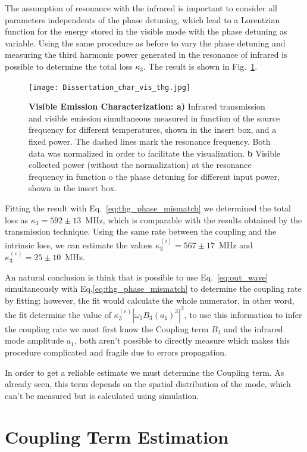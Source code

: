 The assumption of resonance with the infrared is important to consider all parameters independents of the phase detuning, which lead to a Lorentzian function for the energy stored in the visible mode with the phase detuning as variable. Using the same procedure as before to vary the phase detuning and measuring the third harmonic power generated in the resonance of infrared is possible to determine the total loss $\kappa_3$. The result is shown in Fig.~\ref{fig:mode_char_thg}.
\begin{figure}[!h]
    \centering
    \texttt{[image: Dissertation\_char\_vis\_thg.jpg]}
    \caption{\textbf{Visible Emission Characterization: a)} Infrared transmission and visible emission simultaneous measured in function of the source frequency for different temperatures, shown in the insert box, and a fixed power. The dashed lines mark the resonance frequency. Both data was normalized in order to facilitate the visualization. \textbf{b} Visible collected power (without the normalization) at the resonance frequency in function o the phase detuning for different input power,  shown in the insert box.}
    \label{fig:mode_char_thg}
\end{figure}

Fitting the result with Eq.~\ref{eq:thg_phase_mismatch} we determined the total loss as $\kappa_3 = 592\pm13$~MHz, which is comparable with the results obtained by the transmission technique. Using the same rate between the coupling and the intrinsic loss, we can estimate the values $\kappa_3^{(i)} = 567\pm17$~MHz and $\kappa_3^{(e)}=25\pm10$~MHz. 

An natural conclusion is think that is possible to use Eq.~\ref{eq:out_wave} simultaneously with Eq.\ref{eq:thg_phase_mismatch} to determine the coupling rate by fitting; however, the fit would calculate the whole numerator, in other word, the fit determine the value of $\kappa_3^{(e)}|\omega_3 B_3 (a_1)^3|^2$, to use this information to infer the coupling rate we must first know the Coupling term $B_3$ and the infrared mode amplitude $a_1$, both aren't possible to directly measure which makes this procedure complicated and fragile due to errors propagation. 

In order to get a reliable estimate we must determine the Coupling term. As already seen, this term depends on the spatial distribution of the mode, which can't be measured but is calculated using simulation.

\section{Coupling Term Estimation}

